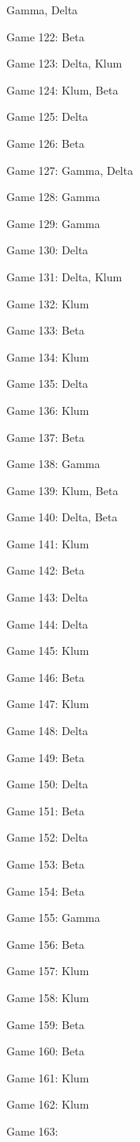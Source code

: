 \documentclass{article}
\begin{document}
\begin{multicols}{3}
\begin{compactitem}
Gamma, Delta
\item Game 122:
Beta
\item Game 123:
Delta, Klum
\item Game 124:
Klum, Beta
\item Game 125:
Delta
\item Game 126:
Beta
\item Game 127:
Gamma, Delta
\item Game 128:
Gamma
\item Game 129:
Gamma
\item Game 130:
Delta
\item Game 131:
Delta, Klum
\item Game 132:
Klum
\item Game 133:
Beta
\item Game 134:
Klum
\item Game 135:
Delta
\item Game 136:
Klum
\item Game 137:
Beta
\item Game 138:
Gamma
\item Game 139:
Klum, Beta
\item Game 140:
Delta, Beta
\item Game 141:
Klum
\item Game 142:
Beta
\item Game 143:
Delta
\item Game 144:
Delta
\item Game 145:
Klum
\item Game 146:
Beta
\item Game 147:
Klum
\item Game 148:
Delta
\item Game 149:
Beta
\item Game 150:
Delta
\item Game 151:
Beta
\item Game 152:
Delta
\item Game 153:
Beta
\item Game 154:
Beta
\item Game 155:
Gamma
\item Game 156:
Beta
\item Game 157:
Klum
\item Game 158:
Klum
\item Game 159:
Beta
\item Game 160:
Beta
\item Game 161:
Klum
\item Game 162:
Klum
\item Game 163:

\end{compactitem}
\end{multicols}
\end{document}
